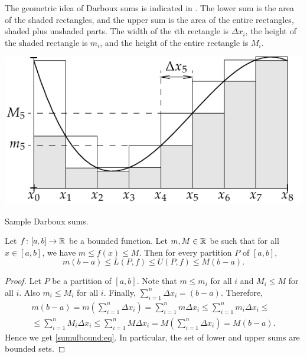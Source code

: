 The geometric idea of Darboux sums is indicated in
.  The lower sum is the area of the shaded
rectangles, and the upper sum is the area of the entire
rectangles, shaded plus unshaded parts.  The width of the $i$th rectangle is $\Delta x_i$,
the height of the shaded rectangle is $m_i$, and the height
of the entire rectangle is $M_i$.

\begin{myfigureht}
\includegraphics{figures/darbouxfig}
\caption{Sample Darboux sums.\label{darbouxfig}}
\end{myfigureht}

\begin{prop} \label{sumulbound:prop}
Let $f \colon [a,b] \to {\mathbb{R}}$ be a bounded function.  Let $m, M \in {\mathbb{R}}$ be 
such that for all $x \in [a,b]$, we have $m \leq f(x) \leq M$.  Then for every partition $P$
of $[a,b]$,
\begin{equation}
\label{sumulbound:eq}
m(b-a) \leq
L(P,f) \leq U(P,f)
\leq M(b-a) .
\end{equation}
\end{prop}

\begin{proof}
Let $P$ be a partition of $[a,b]$.  Note that $m \leq m_i$ for all $i$ and
$M_i \leq M$ for all $i$.  Also $m_i \leq M_i$ for all $i$.  Finally,
$\sum_{i=1}^n \Delta x_i = (b-a)$.  Therefore,
\begin{multline*}
m(b-a) =
m \left( \sum_{i=1}^n \Delta x_i \right)
=
\sum_{i=1}^n m \Delta x_i
\leq
\sum_{i=1}^n m_i \Delta x_i 
\leq
\\
\leq
\sum_{i=1}^n M_i \Delta x_i
\leq
\sum_{i=1}^n M \Delta x_i 
=
M \left( \sum_{i=1}^n \Delta x_i \right)
=
M(b-a) .
\end{multline*}
Hence we get \eqref{sumulbound:eq}.  In particular, the set of lower and
upper sums are bounded sets.
\end{proof}

